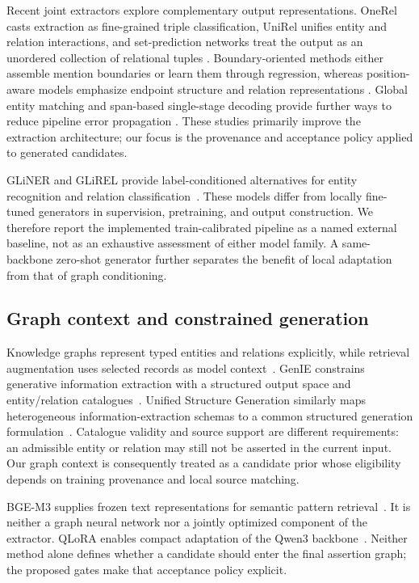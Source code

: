 \documentclass[a4paper,fleqn,numbers,doubleblind]{cas-dc}
\begin{document}
Recent joint extractors explore complementary output representations. OneRel
casts extraction as fine-grained triple classification, UniRel unifies entity
and relation interactions, and set-prediction networks treat the output as an
unordered collection of relational tuples
\cite{shang2022onerel,tang2022unirel,sui2024setprediction}. Boundary-oriented
methods either assemble mention boundaries or learn them through regression,
whereas position-aware models emphasize endpoint structure and relation
representations
\cite{tang2022boundaryassembling,tang2023boundaryregression,chen2022positionaware,zhang2022positionaware}.
Global entity matching and span-based single-stage decoding provide further
ways to reduce pipeline error propagation
\cite{gao2023ergm,han2023spanbased}. These studies primarily improve the
extraction architecture; our focus is the provenance and acceptance policy
applied to generated candidates.

GLiNER and GLiREL provide label-conditioned alternatives for entity recognition
and relation classification~\cite{zaratiana2024gliner,boylan2025glirel}.
These models differ from locally fine-tuned generators in supervision,
pretraining, and output construction. We therefore report the implemented
train-calibrated pipeline as a named external baseline, not as an exhaustive
assessment of either model family. A same-backbone zero-shot generator further
separates the benefit of local adaptation from that of graph conditioning.

\subsection{Graph context and constrained generation}
Knowledge graphs represent typed entities and relations explicitly, while
retrieval augmentation uses selected records as model
context~\cite{hogan2021kg,lewis2020rag}. GenIE constrains generative information
extraction with a structured output space and entity/relation
catalogues~\cite{josifoski2022genie}. Unified Structure Generation similarly
maps heterogeneous information-extraction schemas to a common structured
generation formulation~\cite{lu2022uie}. Catalogue validity and source support
are different requirements: an admissible entity or relation may still not be
asserted in the current input. Our graph context is consequently treated as a
candidate prior whose eligibility depends on training provenance and local
source matching.

BGE-M3 supplies frozen text representations for semantic pattern
retrieval~\cite{chen2024bgem3}. It is neither a graph neural network nor a
jointly optimized component of the extractor. QLoRA enables compact adaptation
of the Qwen3 backbone~\cite{dettmers2023qlora,qwen2025qwen3}. Neither method
alone defines whether a candidate should enter the final assertion graph; the
proposed gates make that acceptance policy explicit.
\end{document}
